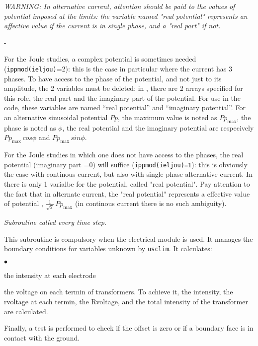 {{{ {\em WARNING: In alternative current, attention should be paid to the values of potential
 imposed at the limits: the variable named "real potential" represents an affective
 value if the current is in single phase, and a "real part" if not.}
\begin{list}{-}{}
\item For the Joule studies, a complex potential is sometimes needed
 (\texttt{ippmod(ieljou)}=2): this is the  case in particular where the current
 has 3 phases. To have access to the phase of the potential, and not just to its
 amplitude, the 2 variables must be deleted: in \CS, there are 2 arrays
 specified for this role, the real part and the imaginary
 part of the potential. For use in the code, these variables are named
 ``real potential'' and ``imaginary potential''. For an alternative
 sinusoidal potential $Pp$, the maximum value is noted as $Pp_\text{max}$,
 the phase is noted as $\phi$, the real potential
 and the imaginary potential are respecively $Pp_\text{max}\,cos\phi$ and
$Pp_\text{max}\,sin\phi$.
\item For the Joule studies in which one does not have access to the phases, the real
 potential (imaginary part =0) will suffice (\texttt{ippmod(ieljou)=1}): this is
 obviously the case with
 continous current, but also with single phase alternative current. In \CS
there is only 1 varialbe for the potential,  called "real potential". Pay attention to
 the fact that in alternate current, the "real potential" represents a effective value
 of potential , $\frac{1}{\sqrt{2}}\,Pp_\text{max}$ (in continous current there is no
 such ambiguity).
\end{list}

\noindent
\textit{Subroutine called every time step.}

This subroutine is compulsory when the electrical module is used. It
 manages the boundary conditions for variables unknown by \texttt{usclim}.
 It calculates:
\begin{list}{$\bullet$}{}
\item  the intensity at each electrode
\item  the voltage on each termin of transformers. To achieve it, the intensity,
 the rvoltage at each termin, the Rvoltage, and the total intensity of the 
transformer are calculated. 
\end{list}

Finally, a test is performed to check if the offset is zero or if a boundary
 face is in contact with the ground.

}}}
